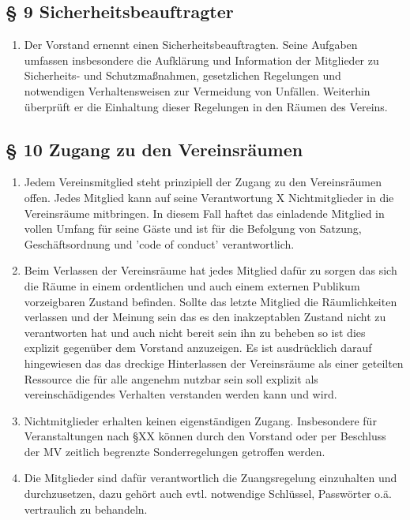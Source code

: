 \documentclass[10pt,a4paper]{article}
\begin{document}
\subsection*{§ 9 Sicherheitsbeauftragter}
\begin{enumerate}
\item Der Vorstand ernennt einen Sicherheitsbeauftragten. Seine Aufgaben
	umfassen insbesondere die Aufklärung und Information der Mitglieder
	zu Sicherheits- und Schutzmaßnahmen, gesetzlichen Regelungen und
	notwendigen Verhaltensweisen zur Vermeidung von Unfällen. Weiterhin
	überprüft er die Einhaltung dieser Regelungen in den Räumen des
	Vereins.
\end{enumerate}

\subsection*{§ 10 Zugang zu den Vereinsräumen}
\begin{enumerate}
	\item Jedem Vereinsmitglied steht prinzipiell der Zugang zu den
		Vereinsräumen offen.  Jedes Mitglied kann auf seine
		Verantwortung X Nichtmitglieder in die Vereinsräume mitbringen.
		In diesem Fall haftet das einladende Mitglied in vollen Umfang
		für seine Gäste und ist für die Befolgung von Satzung,
		Geschäftsordnung und 'code of conduct' verantwortlich.
	\item Beim Verlassen der Vereinsräume hat jedes Mitglied dafür zu
		sorgen das sich die Räume in einem ordentlichen und auch einem
		externen Publikum vorzeigbaren Zustand befinden. Sollte das
		letzte Mitglied die Räumlichkeiten verlassen und der Meinung
		sein das es den inakzeptablen Zustand nicht zu verantworten hat
		und auch nicht bereit sein ihn zu beheben so ist dies explizit
		gegenüber dem Vorstand anzuzeigen. Es ist ausdrücklich darauf
		hingewiesen das das dreckige Hinterlassen der Vereinsräume als
		einer geteilten Ressource die für alle angenehm nutzbar sein
		soll explizit als vereinschädigendes Verhalten verstanden
		werden kann und wird.
	\item Nichtmitglieder erhalten keinen eigenständigen Zugang.
		Insbesondere für Veranstaltungen nach §XX %
		können durch den Vorstand oder per Beschluss der MV zeitlich
		begrenzte Sonderregelungen getroffen werden.
	\item Die Mitglieder sind dafür verantwortlich die Zuangsregelung
		einzuhalten und durchzusetzen, dazu gehört auch evtl.
		notwendige Schlüssel, Passwörter o.ä. vertraulich zu behandeln.
\end{enumerate}
\end{document}
